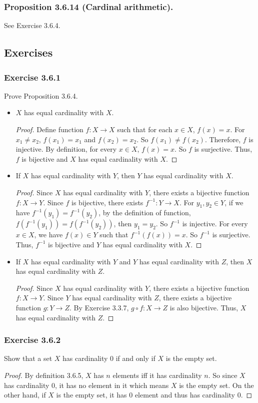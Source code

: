 \documentclass[12pt, letter]{article}
\begin{document}
\subsubsection*{Proposition 3.6.14 (Cardinal arithmetic).}
See Exercise 3.6.4.
\subsection*{Exercises}
\subsubsection*{Exercise 3.6.1}
Prove Proposition 3.6.4.
\begin{itemize}
    \item $X$ has equal cardinality with $X$.
    \begin{proof}
        Define function $f:X\to X$ such that for each $x\in X$, $f(x)=x$. For $x_1\ne x_2$, $f(x_1)=x_1$ and $f(x_2)=x_2$. So $f(x_1)\ne f(x_2)$. Therefore,
        $f$ is injective. By definition, for every $x\in X$, $f(x)=x$. So $f$ is surjective. Thus, $f$ is bijective and $X$ has equal cardinality with $X$.
    \end{proof}
    \item If $X$ has equal cardinality with $Y$, then $Y$ has equal cardinality with $X$.
    \begin{proof}
        Since $X$ has equal cardinality with $Y$, there exists a bijective function $f:X\to Y$. Since $f$ is bijective, there exists $f^{-1}:Y\to X$. For $y_1,y_2\in Y$, 
        if we have $f^{-1}(y_1)=f^{-1}(y_2)$, by the definition of function, $f(f^{-1}(y_1))=f(f^{-1}(y_2))$, then $y_1=y_2$. So $f^{-1}$ is injective.
        For every $x\in X$, we have $f(x)\in Y$ such that $f^{-1}(f(x))=x$. So $f^{-1}$ is surjective. Thus, $f^{-1}$ is bijective and $Y$ has equal cardinality with $X$.
    \end{proof}
    \item If $X$ has equal cardinality with $Y$ and $Y$ has equal cardinality with $Z$, then $X$ has equal cardinality with $Z$.
    \begin{proof}
        Since $X$ has equal cardinality with $Y$, there exists a bijective function $f:X\to Y$. Since $Y$ has equal cardinality with $Z$, there exists a bijective function $g:Y\to Z$.
        By Exercise 3.3.7, $g\circ f:X\to Z$ is also bijective. Thus, $X$ has equal cardinality with $Z$.
    \end{proof}
\end{itemize}
\subsubsection*{Exercise 3.6.2}
Show that a set $X$ has cardinality 0 if and only if $X$ is the empty set.
\begin{proof}
    By definition 3.6.5, $X$ has $n$ elements iff it has cardinality $n$. So since $X$ has cardinality 0, it has no element in it which means $X$ is the empty set.
    On the other hand, if $X$ is the empty set, it has 0 element and thus has cardinality 0.
\end{proof}
\end{document}
